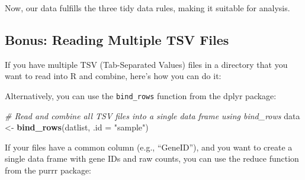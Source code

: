 \documentclass[
]{book}
\newenvironment{Shaded}{\begin{snugshade}}{\end{snugshade}}
\newcommand{\AttributeTok}[1]{\textcolor[rgb]{0.13,0.29,0.53}{#1}}
\newcommand{\CommentTok}[1]{\textcolor[rgb]{0.56,0.35,0.01}{\textit{#1}}}
\newcommand{\ConstantTok}[1]{\textcolor[rgb]{0.56,0.35,0.01}{#1}}
\newcommand{\ControlFlowTok}[1]{\textcolor[rgb]{0.13,0.29,0.53}{\textbf{#1}}}
\newcommand{\FunctionTok}[1]{\textcolor[rgb]{0.13,0.29,0.53}{\textbf{#1}}}
\newcommand{\NormalTok}[1]{#1}
\newcommand{\OtherTok}[1]{\textcolor[rgb]{0.56,0.35,0.01}{#1}}
\newcommand{\SpecialCharTok}[1]{\textcolor[rgb]{0.81,0.36,0.00}{\textbf{#1}}}
\newcommand{\StringTok}[1]{\textcolor[rgb]{0.31,0.60,0.02}{#1}}
\begin{document}
Now, our data fulfills the three tidy data rules, making it suitable for analysis.

\hypertarget{bonus-reading-multiple-tsv-files}{%
\subsection{Bonus: Reading Multiple TSV Files}\label{bonus-reading-multiple-tsv-files}}

If you have multiple TSV (Tab-Separated Values) files in a directory that you want to read into R and combine, here's how you can do it:

\begin{Shaded}
\end{Shaded}

Alternatively, you can use the \texttt{bind\_rows} function from the dplyr package:

\begin{Shaded}
\begin{Highlighting}[]
\CommentTok{\# Read and combine all TSV files into a single data frame using bind\_rows}
\NormalTok{data }\OtherTok{\textless{}{-}} \FunctionTok{bind\_rows}\NormalTok{(datlist, }\AttributeTok{.id =} \StringTok{"sample"}\NormalTok{)}
\end{Highlighting}
\end{Shaded}

If your files have a common column (e.g., ``GeneID''), and you want to create a single data frame with gene IDs and raw counts, you can use the reduce function from the purrr package:
\end{document}
